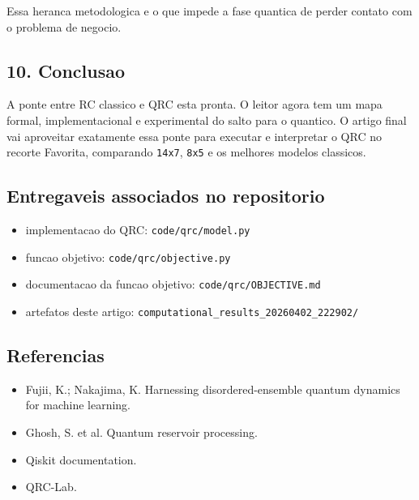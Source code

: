 \documentclass[12pt]{article}
\providecommand{\tightlist}{%
          \setlength{\itemsep}{0pt}\setlength{\parskip}{0pt}}
\begin{document}
Essa heranca metodologica e o que impede a fase quantica de perder contato com o problema de negocio.

\subsection{10. Conclusao}\label{10-conclusao}

A ponte entre RC classico e QRC esta pronta. O leitor agora tem um mapa formal, implementacional e experimental do salto para o quantico. O artigo final vai aproveitar exatamente essa ponte para executar e interpretar o QRC no recorte Favorita, comparando \texttt{14x7}, \texttt{8x5} e os melhores modelos classicos.

\subsection{Entregaveis associados no repositorio}\label{entregaveis-associados-no-repositorio}

\begin{itemize}
\tightlist
\item
  implementacao do QRC: \texttt{code/qrc/model.py}
\item
  funcao objetivo: \texttt{code/qrc/objective.py}
\item
  documentacao da funcao objetivo: \texttt{code/qrc/OBJECTIVE.md}
\item
  artefatos deste artigo: \texttt{computational\_results\_20260402\_222902/}
\end{itemize}

\subsection{Referencias}\label{referencias}

\begin{itemize}
\tightlist
\item
  Fujii, K.; Nakajima, K. Harnessing disordered-ensemble quantum dynamics for machine learning.
\item
  Ghosh, S. et al. Quantum reservoir processing.
\item
  Qiskit documentation.
\item
  QRC-Lab.
\end{itemize}

        
\end{document}
